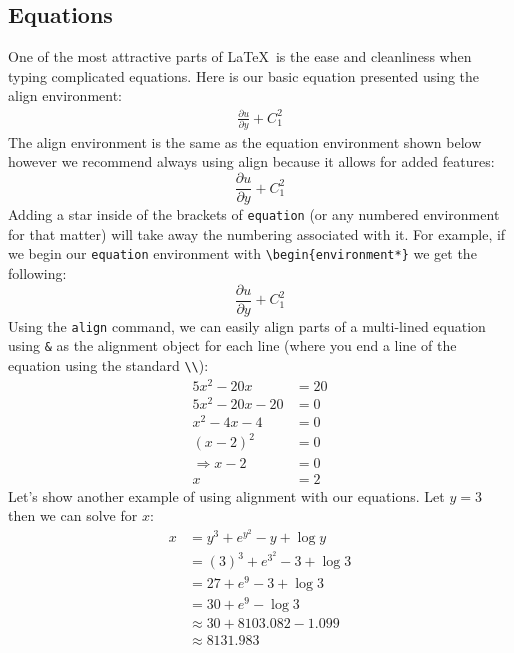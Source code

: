\documentclass[]{article}%
\newcommand{\bs}{\textbackslash}
\newcommand{\TT}[1]{\texttt{#1}}
\theoremstyle{definition}
\begin{document}
\subsection{Equations}
\label{sec:equations}
One of the most attractive parts of \LaTeX\ is the ease and cleanliness when typing complicated equations. 
%
Here is our basic equation presented using the align environment:
\begin{align}
\label{eq:example}
	\frac{\partial u}{\partial y} + C_1^2  
\end{align}
%
The align environment is the same as the equation environment shown below however we recommend always using align because it allows for added features:
\begin{equation}
	\frac{\partial u}{\partial y} + C_1^2  
\end{equation}
%
Adding a star inside of the brackets of \TT{equation} (or any numbered environment for that matter) will take away the numbering associated with it.
For example, if we begin our \TT{equation} environment with \TT{\bs begin\{environment*\}} we get the following:
\begin{equation*}
	\frac{\partial u}{\partial y} + C_1^2  
\end{equation*}
%
Using the \TT{align} command, we can easily align parts of a multi-lined equation using \TT{\&} as the alignment object for each line (where you end a line of the equation using the standard \TT{\bs \bs}):
\begin{align*}
	5 x^2 - 20x &= 20 \\
	5 x^2 - 20x -20 &= 0 \\ 
	x^2 - 4x -4 &= 0 \\
	(x-2)^2 &= 0 \\
	\Rightarrow x - 2 &= 0 \\
	x &= 2
\end{align*}
%
Let's show another example of using alignment with our equations. Let $y=3$ then we can solve for $x$:
\begin{align*}
	x &= y^3 + e^{y^2} - y + \log y \\
	& = (3)^3 + e^{3^2} - 3 + \log 3 \\
	& = 27 + e^9 - 3 + \log 3 \\
	& = 30 + e^9 - \log 3 \\
	& \approx 30 + 8103.082  - 1.099 \\
	& \approx \mathbf{8131.983}
\end{align*}
\end{document}
